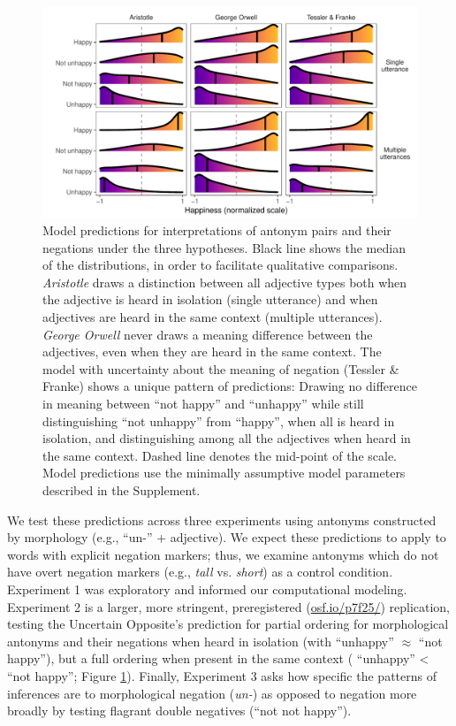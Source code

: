 \documentclass[floatsintext,doc]{apa6}
\begin{document}
\begin{figure}[t]
\centering \includegraphics{figs/alternativeModels_dists4.pdf} 
\caption{Model predictions for interpretations of antonym pairs and their negations under the three hypotheses. Black line shows the median of the distributions, in order to facilitate qualitative comparisons. \emph{Aristotle} draws a distinction between all adjective types both when the adjective is heard in isolation (single utterance) and when adjectives are heard in the same context (multiple utterances). \emph{George Orwell} never draws a meaning difference between the adjectives, even when they are heard in the same context. The model with uncertainty about the meaning of negation (Tessler \& Franke) shows a unique pattern of predictions: Drawing no difference in meaning between ``not happy'' and ``unhappy'' while still distinguishing ``not unhappy'' from ``happy'', when all is heard in isolation, and distinguishing among all the adjectives when heard in the same context. Dashed line denotes the mid-point of the scale. Model predictions use the minimally assumptive model parameters described in the Supplement.}
\label{fig:modelPredictions}
\end{figure}

We test these predictions across three experiments using antonyms constructed by morphology (e.g., ``un-'' + adjective).
We expect these predictions to apply to words with explicit negation markers; thus, we examine antonyms which do not have overt negation markers (e.g., \emph{tall} vs. \emph{short}) as a control condition.
Experiment 1 was exploratory and informed our computational modeling.
Experiment 2 is a larger, more stringent, preregistered (\url{osf.io/p7f25/}) replication, testing the Uncertain Opposite's prediction for partial ordering for morphological antonyms and their negations when heard in isolation (with ``unhappy'' \(\approx\) ``not happy''), but a full ordering when present in the same context ( ``unhappy'' < ``not happy''; Figure \ref{fig:modelPredictions}).
Finally, Experiment 3 asks how specific the patterns of inferences are to morphological negation (\emph{un-}) as opposed to negation more broadly by testing flagrant double negatives (``not not happy'').
\end{document}
